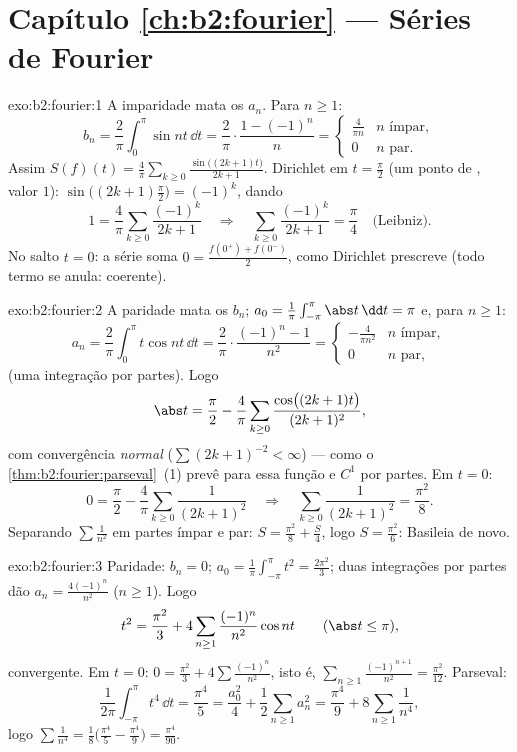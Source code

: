 \section*{Capítulo \ref{ch:b2:fourier} --- Séries de Fourier}

\begin{solution}{exo:b2:fourier:1}
A imparidade mata os $a_n$. Para $n \geq 1$:
\[
b_n = \frac{2}{\pi}\int_0^{\pi} \sin nt\,\dd t
= \frac{2}{\pi}\cdot\frac{1 - (-1)^n}{n}
= \begin{cases} \frac{4}{\pi n} & n \text{ ímpar},\\ 0 & n
\text{ par}. \end{cases}
\]
Assim $S(f)(t) = \frac{4}{\pi}\sum_{k\geq0} \frac{\sin\bigl((2k+1)t
\bigr)}{2k+1}$. Dirichlet em $t = \frac\pi2$ (um ponto de ,
valor $1$): $\sin\bigl((2k+1)\frac\pi2\bigr) = (-1)^k$, dando
\[
1 = \frac4\pi \sum_{k\geq0}\frac{(-1)^k}{2k+1}
\quad\Longrightarrow\quad
\sum_{k\geq0}\frac{(-1)^k}{2k+1} = \frac{\pi}{4}
\quad\text{(Leibniz)}.
\]
No salto $t = 0$: a série soma $0 = \frac{f(0^+) +
f(0^-)}{2}$, como Dirichlet prescreve (todo termo se anula:
coerente).
\end{solution}

\begin{solution}{exo:b2:fourier:2}
A paridade mata os $b_n$; $a_0 = \frac{1}{\pi}\int_{-\pi}^\pi\abs
t\,\dd t = \pi$ e, para $n \geq 1$:
\[
a_n = \frac{2}{\pi}\int_0^\pi t\cos nt\,\dd t
= \frac{2}{\pi}\cdot\frac{(-1)^n - 1}{n^2}
= \begin{cases} -\frac{4}{\pi n^2} & n \text{ ímpar},\\ 0 & n
\text{ par}, \end{cases}
\]
(uma integração por partes). Logo
\[
\abs t = \frac{\pi}{2} - \frac{4}{\pi}\sum_{k\geq0}
\frac{\cos\bigl((2k+1)t\bigr)}{(2k+1)^2} ,
\]
com convergência \emph{normal} ($\sum (2k+1)^{-2} < \infty$) --- como o
\cref{thm:b2:fourier:parseval}~(1) prevê para essa função 
e $C^1$ por partes. Em $t = 0$:
\[
0 = \frac\pi2 - \frac4\pi\sum_{k\geq0}\frac{1}{(2k+1)^2}
\quad\Longrightarrow\quad
\sum_{k\geq0}\frac{1}{(2k+1)^2} = \frac{\pi^2}{8} .
\]
Separando $\sum \frac{1}{n^2}$ em partes ímpar e par: $S =
\frac{\pi^2}{8} + \frac S4$, logo $S = \frac{\pi^2}{6}$: Basileia de novo.
\end{solution}

\begin{solution}{exo:b2:fourier:3}
Paridade: $b_n = 0$; $a_0 = \frac{1}{\pi}\int_{-\pi}^{\pi} t^2 =
\frac{2\pi^2}{3}$; duas integrações por partes dão $a_n =
\frac{4(-1)^n}{n^2}$ ($n \geq 1$). Logo
\[
t^2 = \frac{\pi^2}{3} + 4\sum_{n\geq1}
\frac{(-1)^n}{n^2}\cos nt
\qquad (\abs t \leq \pi),
\]
 convergente. Em $t = 0$: $0 = \frac{\pi^2}{3} +
4\sum\frac{(-1)^n}{n^2}$, isto é, $\sum_{n\geq1}
\frac{(-1)^{n+1}}{n^2} = \frac{\pi^2}{12}$. Parseval:
\[
\frac{1}{2\pi}\int_{-\pi}^{\pi} t^4\,\dd t = \frac{\pi^4}{5}
= \frac{a_0^2}{4} + \frac12\sum_{n\geq1} a_n^2
= \frac{\pi^4}{9} + 8\sum_{n\geq1}\frac{1}{n^4} ,
\]
logo $\sum \frac{1}{n^4} = \frac18\bigl(\frac{\pi^4}{5} -
\frac{\pi^4}{9}\bigr) = \frac{\pi^4}{90}$.
\end{solution}

